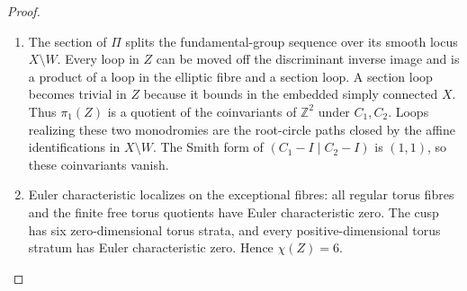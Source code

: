 \documentclass[11pt,a4paper]{article}
\numberwithin{equation}{section}
\theoremstyle{definition}
\begin{document}
\begin{proof}
\begin{enumerate}[label=\arabic*.,leftmargin=*]
\item The section of $\Pi$ splits the fundamental-group sequence over its
smooth locus $X\setminus W$.  Every loop in $Z$ can be moved off
the discriminant inverse image and is a product of a loop in the
elliptic fibre and a section loop.  A section loop becomes trivial
in $Z$ because it bounds in the embedded simply connected $X$.
Thus $\pi_1(Z)$ is a quotient of the coinvariants of
$\mathbb Z^2$ under $C_1,C_2$.  Loops realizing these two
monodromies are the root-circle paths closed by the affine
identifications in $X\setminus W$.  The Smith form of
$(C_1-I\mid C_2-I)$ is $(1,1)$, so these coinvariants vanish.

\item Euler characteristic localizes on the exceptional fibres: all
regular torus fibres and the finite free torus quotients have Euler
characteristic zero.  The cusp has six zero-dimensional torus
strata, and every positive-dimensional torus stratum has Euler
characteristic zero.  Hence $\chi(Z)=6$.


\end{enumerate}
\end{proof}
\end{document}
